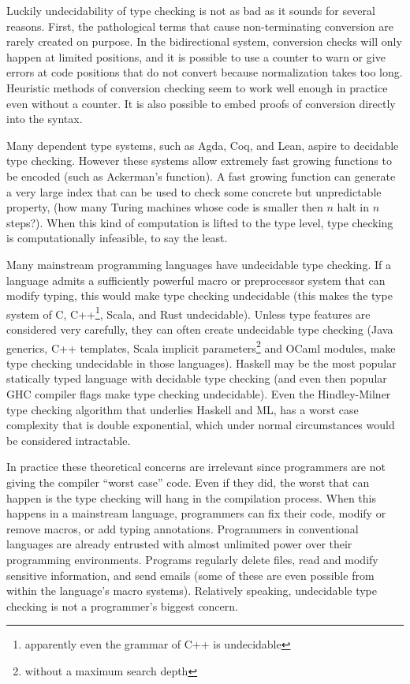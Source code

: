 Luckily undecidability of type checking is not as bad as it sounds for several reasons.
First, the pathological terms that cause non-terminating conversion are rarely created on purpose.
In the bidirectional system, conversion checks will only happen at limited positions, and it is possible to use a counter to warn or give errors at code positions that do not convert because normalization takes too long.
Heuristic methods of conversion checking seem to work well enough in practice even without a counter.
It is also possible to embed proofs of conversion directly into the syntax\cite{sjoberg2012irrelevance}.

Many dependent type systems, such as Agda, Coq, and Lean, aspire to decidable type checking.
However these systems allow extremely fast growing functions to be encoded (such as Ackerman's function).
A fast growing function can generate a very large index that can be used to check some concrete but unpredictable property, (how many Turing machines whose code is smaller then $n$ halt in $n$ steps?).
When this kind of computation is lifted to the type level, type checking is computationally infeasible, to say the least.


Many mainstream programming languages have undecidable type checking.
If a language admits a sufficiently powerful macro or preprocessor system that can modify typing, this would make type checking undecidable (this makes the type system of C, C++\footnote{apparently even the grammar of C++ is undecidable}, Scala, and Rust undecidable).
Unless type features are considered very carefully, they can often create undecidable type checking (Java generics, C++ templates, Scala implicit parameters\footnote{without a maximum search depth} and OCaml modules, make type checking undecidable in those languages).
Haskell may be the most popular statically typed language with decidable type checking (and even then popular GHC compiler flags make type checking undecidable).
Even the Hindley-Milner type checking algorithm that underlies Haskell and ML, has a worst case complexity that is double exponential, which under normal circumstances would be considered intractable.

In practice these theoretical concerns are irrelevant since programmers are not giving the compiler ``worst case'' code.
Even if they did, the worst that can happen is the type checking will hang in the compilation process.
When this happens in a mainstream language, programmers can fix their code, modify or remove macros, or add typing annotations.
Programmers in conventional languages are already entrusted with almost unlimited power over their programming environments.
Programs regularly delete files, read and modify sensitive information, and send emails (some of these are even possible from within the language's macro systems).
Relatively speaking, undecidable type checking is not a programmer's biggest concern.

